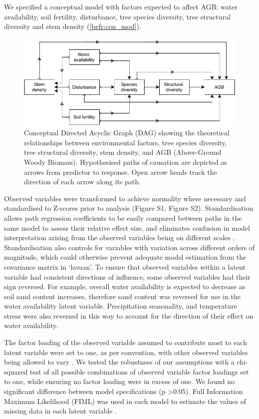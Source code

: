 \begin{refsection}
We specified a conceptual model with factors expected to affect AGB: water availability, soil fertility, disturbance, tree species diversity, tree structural diversity and stem density (\autoref{befr:con_mod}). 

\begin{figure}
\includegraphics[width=\linewidth]{img/concept.drawio}
\caption[Conceptual model path diagram]{Conceptual Directed Acyclic Graph (DAG) showing the theoretical relationships between environmental factors, tree species diversity, tree structural diversity, stem density, and AGB (Above-Ground Woody Biomass). Hypothesised paths of causation are depicted as arrows from predictor to response. Open arrow heads track the direction of each arrow along its path.}
	\label{befr:con_mod}
\end{figure}

Observed variables were transformed to achieve normality where necessary and standardised to Z-scores prior to analysis (Figure S1, Figure S2). Standardisation allows path regression coefficients to be easily compared between paths in the same model to assess their relative effect size, and eliminates confusion in model interpretation arising from the observed variables being on different scales \citep{Beaujean2014}. Standardisation also controls for variables with variation across different orders of magnitude, which could otherwise prevent adequate model estimation from the covariance matrix in `lavaan'. To ensure that observed variables within a latent variable had consistent directions of influence, some observed variables had their sign reversed. For example, overall water availability is expected to decrease as soil sand content increases, therefore sand content was reversed for use in the water availability latent variable. Precipitation seasonality, and temperature stress were also reversed in this way to account for the direction of their effect on water availability. 

The factor loading of the observed variable assumed to contribute most to each latent variable were set to one, as per convention, with other observed variables being allowed to vary \citep{Beaujean2014}. We tested the robustness of our assumptions with a chi-squared test of all possible combinations of observed variable factor loadings set to one, while ensuring no factor loading were in excess of one. We found no significant difference between model specifications (p >0.05). Full Information Maximum Likelihood (FIML) was used in each model to estimate the values of missing data in each latent variable \citep{Cham2017}.


\end{refsection}
